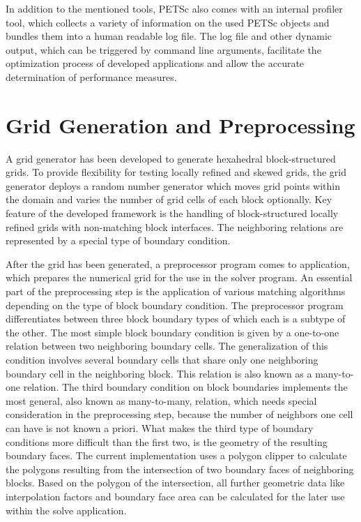 In addition to the mentioned tools, PETSc also comes with an internal profiler tool, which collects a variety of information on the used PETSc objects and bundles them into a human readable log file. The log file and other dynamic output, which can be triggered by command line arguments, facilitate the optimization process of developed applications and allow the accurate determination of performance measures.

\section{Grid Generation and Preprocessing}
\label{sec:gridpreproc}

A grid generator has been developed to generate hexahedral block-structured grids. To provide flexibility for testing locally refined and skewed grids, the grid generator deploys a random number generator which moves grid points within the domain and varies the number of grid cells of each block optionally. Key feature of the developed framework is the handling of block-structured locally refined grids with non-matching block interfaces. The neighboring relations are represented by a special type of boundary condition.

After the grid has been generated, a preprocessor program comes to application, which prepares the numerical grid for the use in the solver program. An essential part of the preprocessing step is the application of various matching algorithms depending on the type of block boundary condition. The preprocessor program differentiates between three block boundary types of which each is a subtype of the other. The most simple block boundary condition is given by a one-to-one relation between two neighboring boundary cells. The generalization of this condition involves several boundary cells that share only one neighboring boundary cell in the neighboring block. This relation is also known as a many-to-one relation. The third boundary condition on block boundaries implements the most general, also known as many-to-many, relation, which needs special consideration in the preprocessing step, because the number of neighbors one cell can have is not known a priori. What makes the third type of boundary conditions more difficult than the first two, is the geometry of the resulting boundary faces. The current implementation uses a polygon clipper to calculate the polygons resulting from the intersection of two boundary faces of neighboring blocks. Based on the polygon of the intersection, all further geometric data like interpolation factors and boundary face area can be  calculated for the later use within the solve application.


